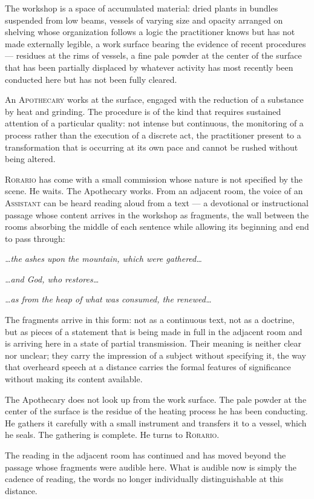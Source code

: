 \documentclass[12pt, oneside]{article}
\newenvironment{action}{%
  \vspace{0.6em}%
  \noindent\ignorespaces%
}{%
  \par\vspace{0.6em}%
}
\begin{document}
\begin{action}
The workshop is a space of accumulated material: dried plants in bundles suspended from low beams, vessels of varying size and opacity arranged on shelving whose organization follows a logic the practitioner knows but has not made externally legible, a work surface bearing the evidence of recent procedures --- residues at the rims of vessels, a fine pale powder at the center of the surface that has been partially displaced by whatever activity has most recently been conducted here but has not been fully cleared.

An \textsc{Apothecary} works at the surface, engaged with the reduction of a substance by heat and grinding. The procedure is of the kind that requires sustained attention of a particular quality: not intense but continuous, the monitoring of a process rather than the execution of a discrete act, the practitioner present to a transformation that is occurring at its own pace and cannot be rushed without being altered.

\textsc{Rorario} has come with a small commission whose nature is not specified by the scene. He waits. The Apothecary works. From an adjacent room, the voice of an \textsc{Assistant} can be heard reading aloud from a text --- a devotional or instructional passage whose content arrives in the workshop as fragments, the wall between the rooms absorbing the middle of each sentence while allowing its beginning and end to pass through:
\end{action}

\begin{action}
\textit{\ldots{}the ashes upon the mountain, which were gathered\ldots}

\textit{\ldots{}and God, who restores\ldots}

\textit{\ldots{}as from the heap of what was consumed, the renewed\ldots}
\end{action}

\begin{action}
The fragments arrive in this form: not as a continuous text, not as a doctrine, but as pieces of a statement that is being made in full in the adjacent room and is arriving here in a state of partial transmission. Their meaning is neither clear nor unclear; they carry the impression of a subject without specifying it, the way that overheard speech at a distance carries the formal features of significance without making its content available.

The Apothecary does not look up from the work surface. The pale powder at the center of the surface is the residue of the heating process he has been conducting. He gathers it carefully with a small instrument and transfers it to a vessel, which he seals. The gathering is complete. He turns to \textsc{Rorario}.

The reading in the adjacent room has continued and has moved beyond the passage whose fragments were audible here. What is audible now is simply the cadence of reading, the words no longer individually distinguishable at this distance.
\end{action}
\end{document}
